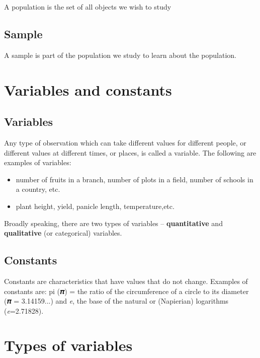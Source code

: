 \documentclass[
]{book}
\begin{document}
A population is the set of all objects we wish to study

\hypertarget{sample}{%
\subsection{Sample}\label{sample}}

A sample is part of the population we study to learn about the
population.

\hypertarget{variables-and-constants}{%
\section{Variables and constants}\label{variables-and-constants}}

\hypertarget{variables}{%
\subsection{Variables}\label{variables}}

Any type of observation which can take different values for different
people, or different values at different times, or places, is called a
variable. The following are examples of variables:

\begin{itemize}
\item
  number of fruits in a branch, number of plots in a field, number of
  schools in a country, etc.
\item
  plant height, yield, panicle length, temperature,etc.
\end{itemize}

Broadly speaking, there are two types of variables -- \textbf{quantitative}
and \textbf{qualitative} (or categorical) variables.

\hypertarget{constants}{%
\subsection{Constants}\label{constants}}

Constants are characteristics that have values that do not change.
Examples of constants are: pi (𝝅) = the ratio of the circumference of a
circle to its diameter (𝝅 = 3.14159...) and \emph{e}, the base of the
natural or (Napierian) logarithms (\emph{e}=2.71828).

\hypertarget{types-of-variables}{%
\section{Types of variables}\label{types-of-variables}}
\end{document}
